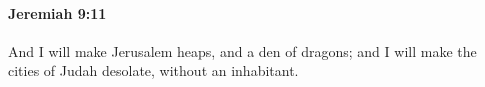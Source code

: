 
		\paragraph{Jeremiah 9:11} %
			\label{JEREMIAH-9-11}

			And I will make Jerusalem heaps, and a den of dragons; and I will make the cities of Judah desolate, without an inhabitant.


